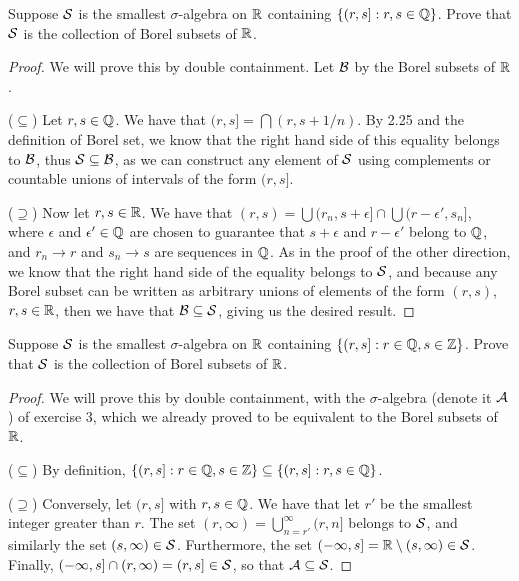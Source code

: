 \begin{exercise}{3}
Suppose $\mathcal{S}$ is the smallest $\sigma$-algebra on $\mathbb{R}$ containing $\{(r,s]:r,s\in\mathbb{Q}\}$.
Prove that $\mathcal{S}$ is the collection of Borel subsets of $\mathbb{R}$.
\end{exercise}
\begin{proof}
We will prove this by double containment.
Let $\mathcal{B}$ by the Borel subsets of $\mathbb{R}$.

($\subseteq$)
Let $r,s\in\mathbb{Q}$.
We have that $(r,s] = \bigcap (r, s+1/n)$.
By 2.25 and the definition of Borel set, we know that the right hand side of this equality belongs to $\mathcal{B}$, thus $\mathcal{S} \subseteq \mathcal{B}$, as we can construct any element of $\mathcal{S}$ using complements or countable unions of intervals of the form $(r,s]$.

($\supseteq$)
Now let $r,s\in\mathbb{R}$.
We have that $(r,s) = \bigcup (r_n, s+\epsilon] \cap \bigcup (r-\epsilon', s_n]$, where $\epsilon$ and $\epsilon' \in \mathbb{Q}$ are chosen to guarantee that $s+\epsilon$ and $r-\epsilon'$ belong to $\mathbb{Q}$, and $r_n \to r$ and $s_n \to s$ are sequences in $\mathbb{Q}$.
As in the proof of the other direction, we know that the right hand side of the equality belongs to $\mathcal{S}$, and because any Borel subset can be written as arbitrary unions of elements of the form $(r,s)$, $r,s\in\mathbb{R}$, then we have that $\mathcal{B} \subseteq \mathcal{S}$, giving us the desired result.
\end{proof} 

\begin{exercise}{4}
Suppose $\mathcal{S}$ is the smallest $\sigma$-algebra on $\mathbb{R}$ containing $\{(r,s]:r\in\mathbb{Q}, s\in\mathbb{Z}\}$.
Prove that $\mathcal{S}$ is the collection of Borel subsets of $\mathbb{R}$.
\end{exercise}
\begin{proof}
We will prove this by double containment, with the $\sigma$-algebra (denote it $\mathcal{A}$) of exercise 3, which we already proved to be equivalent to the Borel subsets of $\mathbb{R}$.

($\subseteq$)
By definition, $\{(r,s]:r\in\mathbb{Q}, s\in\mathbb{Z}\} \subseteq \{(r,s]:r,s\in\mathbb{Q}\}$.

($\supseteq$)
Conversely, let $(r,s]$ with $r,s \in \mathbb{Q}$.
We have that let $r'$ be the smallest integer greater than $r$.
The set $(r,\infty) = \bigcup_{n=r'}^\infty (r,n]$ belongs to $\mathcal{S}$, and similarly the set $(s,\infty) \in \mathcal{S}$.
Furthermore, the set $(-\infty, s] = \mathbb{R} \setminus (s,\infty) \in \mathcal{S}$.
Finally, $(-\infty,s] \cap (r,\infty) = (r,s] \in \mathcal{S}$, so that $\mathcal{A} \subseteq \mathcal{S}$.
\end{proof} 

